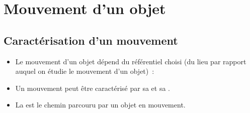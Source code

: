 \documentclass[12pt]{article}
\begin{document}







\section{Mouvement d'un objet}
\subsection{Caractérisation d’un mouvement}
\begin{itemize}
    \item Le mouvement d’un objet dépend du référentiel choisi (du lieu par rapport auquel on étudie le mouvement d’un objet)~:
    \item Un mouvement peut être caractérisé par sa  et sa .
    \item La  est le chemin parcouru par un objet en mouvement.
\end{itemize}
\end{document}
